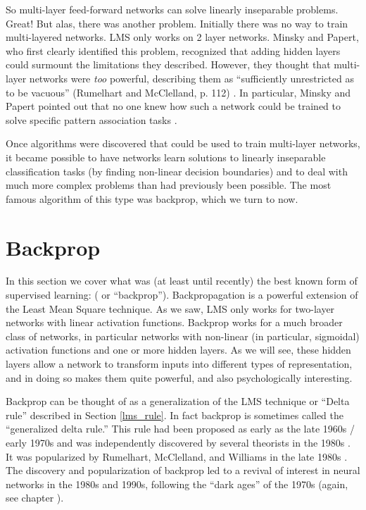 So multi-layer feed-forward networks can solve linearly inseparable problems. Great!  But alas, there was another  problem. Initially there was no way to train multi-layered networks. LMS only works on 2 layer networks. Minsky and Papert, who first clearly identified this problem, recognized that adding hidden layers could surmount the limitations they described. However, they thought that multi-layer networks were {\em too} powerful, describing them as ``sufficiently unrestricted as to be vacuous'' (Rumelhart and McClelland, p. 112) \cite{rumelhart1986parallel}. In particular, Minsky and Papert pointed out that no one knew how such a network could be trained to solve specific pattern association tasks \cite{minsky1969perceptrons}.

Once algorithms were discovered that could be used to train multi-layer networks, it became possible to have networks learn solutions to linearly inseparable classification tasks (by finding non-linear decision boundaries) and to deal with much more complex problems than had previously been possible. The most famous algorithm of this type was backprop, which we turn to now.

\section{Backprop}

In this section we cover what was (at least until recently) the best known form of supervised learning:  ( or ``backprop''). Backpropagation is a powerful extension of the Least Mean Square  technique. As we saw, LMS only works for two-layer networks with linear activation functions. Backprop works for a much broader class of networks, in particular networks with non-linear (in particular, sigmoidal) activation functions and one or more hidden layers. As we will see, these hidden layers allow a network to transform inputs into different types of representation, and in doing so makes them quite powerful, and also psychologically interesting. 

Backprop can be thought of as a generalization of the LMS technique or ``Delta rule'' described in Section \ref{lms_rule}. In fact backprop is sometimes called the ``generalized delta rule.'' This rule had been proposed as early as the late 1960s / early 1970s \cite{bryson1969applied, werbos1974beyond} and was independently discovered by several theorists in the 1980s \cite{le1986learning, parker1985learning}. It was popularized by Rumelhart, McClelland, and Williams in the late 1980s \cite{rumelhart1986parallel}. The discovery and popularization of backprop led to a revival of interest in neural networks in the 1980s and 1990s, following the ``dark ages'' of the 1970s (again, see chapter ).

